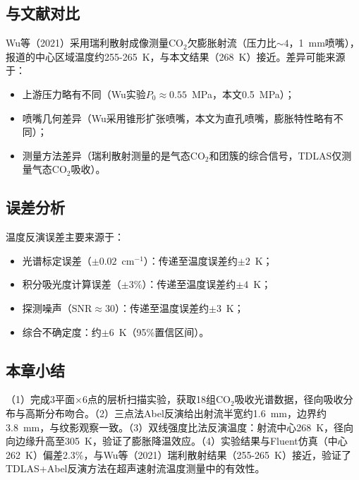 	\subsection{与文献对比}
	Wu等（2021）采用瑞利散射成像测量CO$_2$欠膨胀射流（压力比$\sim4$，1~mm喷嘴），报道的中心区域温度约255-265~K，与本文结果（268~K）接近。差异可能来源于：
	\begin{itemize}
		\item 上游压力略有不同（Wu实验$P_0\approx0.55$~MPa，本文0.5~MPa）；
		\item 喷嘴几何差异（Wu采用锥形扩张喷嘴，本文为直孔喷嘴，膨胀特性略有不同）；
		\item 测量方法差异（瑞利散射测量的是气态CO$_2$和团簇的综合信号，TDLAS仅测量气态CO$_2$吸收）。
	\end{itemize}
	\subsection{误差分析}
	温度反演误差主要来源于：
	\begin{itemize}
		\item 光谱标定误差（$\pm0.02$~cm$^{-1}$）：传递至温度误差约$\pm2$~K；
		\item 积分吸光度计算误差（$\pm3\%$）：传递至温度误差约$\pm4$~K；
		\item 探测噪声（SNR$\approx30$）：传递至温度误差约$\pm3$~K；
		\item 综合不确定度：约$\pm6$~K（95\%置信区间）。
	\end{itemize}
	\subsection{本章小结}
	（1）完成3平面$\times$6点的层析扫描实验，获取18组CO$_2$吸收光谱数据，径向吸收分布与高斯分布吻合。（2）三点法Abel反演给出射流半宽约1.6~mm，边界约3.8~mm，与纹影观察一致。（3）双线强度比法反演温度：射流中心268~K，径向向边缘升高至305~K，验证了膨胀降温效应。（4）实验结果与Fluent仿真（中心262~K）偏差2.3\%，与Wu等（2021）瑞利散射结果（255-265~K）接近，验证了TDLAS+Abel反演方法在超声速射流温度测量中的有效性。

